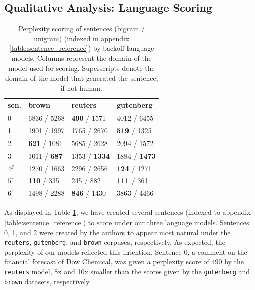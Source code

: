\documentclass[11pt,a4paper]{article}
\begin{document}

\subsection{Qualitative Analysis: Language Scoring}
\label{sub:out_domain_text_analysis_qualitative}



\begin{table}
\begin{tabular}{llll}
\hline
sen. & brown       & reuters     & gutenberg   \\
\hline
  0 & 6836 / 5268 & \textbf{ 490 } / 1571  & 4012 / 6455 \\
  1 & 1901 / 1997 & 1765 / 2670 & \textbf{ 519 } / 1325  \\
  2 & \textbf{ 621 } / 1081  & 5685 / 2628 & 2094 / 1572 \\
  3 & 1011 / \textbf{ 687 }  & 1353 / \textbf{ 1334 } & 1884 / \textbf{ 1473 } \\
  $4^g$ & 1270 / 1663 & 2296 / 2656 & \textbf{ 124 } / 1271   \\
  $5^r$ & \textbf{ 110 } / 335   & 245  / 882   & \textbf{ 111 } / 361   \\
  $6^r$ & 1498 / 2288 & \textbf{ 846 } / 1430  & 3863 / 4466 \\
\hline
\end{tabular}
\caption{Perplexity scoring of sentences (bigram / unigram) (indexed in appendix \ref{table:sentence_reference}) by
  backoff language models. Columns represent the domain of the model used for scoring.
Superscripts denote the domain of the model that generated the sentence, if not human.}
\label{table:sentence_scoring}
\vspace{-15pt}
\end{table}


As displayed in Table \ref{table:sentence_scoring}, we have created several sentences (indexed to appendix \ref{table:sentence_reference}) to score 
under our three language models. Sentences 0, 1, and 2 were created by the authors to appear most natural under the   \texttt{reuters},   \texttt{gutenberg}, and \texttt{brown} corpuses, respectively. As expected, the perplexity of our models reflected this intention. Sentence 0, a comment on the financial forecast of Dow Chemical, was given a perplexity score of 490 by the  \texttt{reuters} model, 8x and 10x smaller than the scores given by the \texttt{gutenberg} and \texttt{brown} datasets, respectively. 
\end{document}
